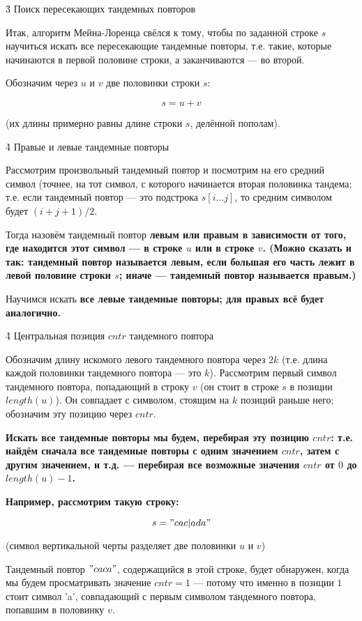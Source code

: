 \h3{ Поиск пересекающих тандемных повторов }

Итак, алгоритм Мейна-Лоренца свёлся к тому, чтобы по заданной строке $s$ научиться искать все пересекающие тандемные повторы, т.е. такие, которые начинаются в первой половине строки, а заканчиваются --- во второй.

Обозначим через $u$ и $v$ две половинки строки $s$:

$$ s = u + v $$

(их длины примерно равны длине строки $s$, делённой пополам).


\h4{ Правые и левые тандемные повторы }

Рассмотрим произвольный тандемный повтор и посмотрим на его средний символ (точнее, на тот символ, с которого начинается вторая половинка тандема; т.е. если тандемный повтор --- это подстрока $s[i \ldots j]$, то средним символом будет $(i+j+1)/2$.

Тогда назовём тандемный повтор \bf{левым или правым} в зависимости от того, где находится этот символ --- в строке $u$ или в строке $v$. (Можно сказать и так: тандемный повтор называется левым, если большая его часть лежит в левой половине строки $s$; иначе --- тандемный повтор называется правым.)

Научимся искать \bf{все левые тандемные повторы}; для правых всё будет аналогично.


\h4{ Центральная позиция $cntr$ тандемного повтора }

Обозначим длину искомого левого тандемного повтора через $2k$ (т.е. длина каждой половинки тандемного повтора --- это $k$). Рассмотрим первый символ тандемного повтора, попадающий в строку $v$ (он стоит в строке $s$ в позиции $length(u)$). Он совпадает с символом, стоящим на $k$ позиций раньше него; обозначим эту позицию через $cntr$.

\bf{Искать все тандемные повторы мы будем, перебирая эту позицию $cntr$}: т.е. найдём сначала все тандемные повторы с одним значением $cntr$, затем с другим значением, и т.д. --- перебирая все возможные значения $cntr$ от $0$ до $length(u)-1$.

\bf{Например}, рассмотрим такую строку:

$$ s = "cac|ada" $$

(символ вертикальной черты разделяет две половинки $u$ и $v$)

Тандемный повтор $"caca"$, содержащийся в этой строке, будет обнаружен, когда мы будем просматривать значение $cntr = 1$ --- потому что именно в позиции $1$ стоит символ 'a', совпадающий с первым символом тандемного повтора, попавшим в половинку $v$.



